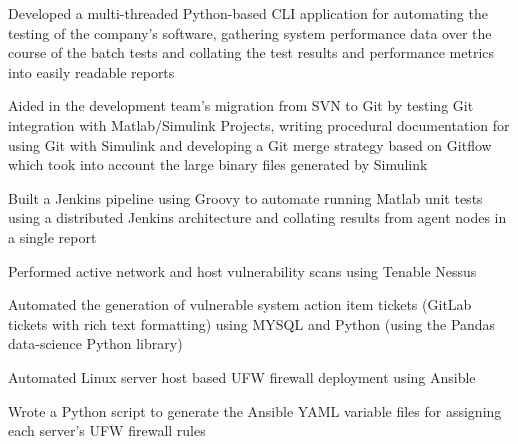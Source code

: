 \documentclass[letterpaper]{deedy-resume} %
\begin{document}
\begin{minipage}[t]{0.66\textwidth}


\begin{tightitemize}
\item Developed a multi-threaded Python-based CLI application for automating the testing of the company’s software, gathering system performance data over the course of the batch tests and collating the test results and performance metrics into easily readable reports
\item Aided in the development team’s migration from SVN to Git by testing Git integration with Matlab/Simulink Projects, writing procedural documentation for using Git with Simulink and developing a Git merge strategy based on Gitflow which took into account the large binary files generated by Simulink
\item Built a Jenkins pipeline using Groovy to automate running Matlab unit tests using a distributed Jenkins architecture and collating results from agent nodes in a single report
\end{tightitemize}

\sectionspace %



\begin{tightitemize}
\item Performed active network and host vulnerability scans using Tenable Nessus
\item Automated the generation of vulnerable system action item tickets (GitLab tickets with rich text formatting) using MYSQL and Python (using the Pandas data-science Python library)
\item Automated Linux server host based UFW firewall deployment using Ansible
\item Wrote a Python script to generate the Ansible YAML variable files for assigning each server’s UFW firewall rules
\end{tightitemize}

\sectionspace %



\end{minipage}
\end{document}
